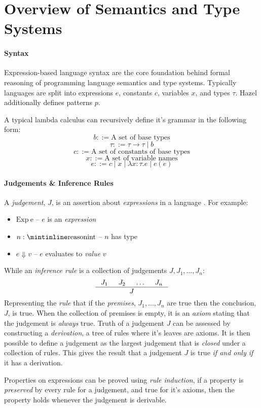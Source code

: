 \chapter{Overview of Semantics and Type Systems}


\subsubsection{Syntax}
Expression-based language syntax are the core foundation behind formal reasoning of programming language semantics and type systems. Typically languages are split into expressions $e$, constants $c$, variables $x$, and types $\tau$. Hazel additionally defines patterns $p$.

A typical lambda calculus can recursively define it's grammar in the following form:
\[b ::= \text{A set of base types}\]
\[\tau ::= \tau \to \tau \mid b\]
\[c ::= \text{A set of constants of base types}\]
\[x ::= \text{A set of variable names}\]
\[e ::= c \mid x \mid \lambda x : \tau. e \mid e(e)\]

\subsubsection{Judgements \& Inference Rules}\label{sec:Judgements}
A \textit{judgement}, $J$, is an assertion about \textit{expressions} in a language \cite{PracticalFoundations}. For example: \begin{itemize}
\item $\mathrm{Exp\ e}$ -- $e$ is an \textit{expression} 
\item $n : \code{int}$ -- $n$ has type 
\item $e \Downarrow v$ -- $e$ evaluates to \textit{value} $v$ 
\end{itemize}
While an \textit{inference rule} is a collection of judgements $J, J_1, \dots, J_n$:
\[\inference{J_1 & J_2 & \dots & J_n}{J}\]
Representing the \textit{rule} that if the \textit{premises}, $J_1, \dots, J_n$ are true then the conclusion, $J$, is true. When the collection of premises is empty, it is an \textit{axiom} stating that the judgement is \textit{always} true. Truth of a judgement $J$ can be assessed by constructing a \textit{derivation}, a tree of rules where it's leaves are axioms. It is then possible to define a judgement as the largest judgement that is \textit{closed} under a collection of rules. This gives the result that a judgement $J$ is true \textit{if and only if} it has a derivation.

Properties on expressions can be proved using \textit{rule induction}, if a property is \textit{preserved} by every rule for a judgement, and true for it's axioms, then the property holds whenever the judgement is derivable.


